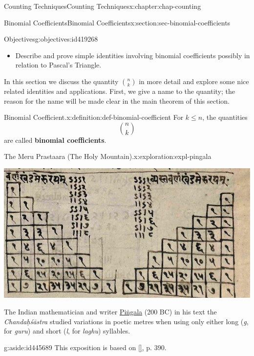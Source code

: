 \documentclass[oneside,10pt,]{book}
\newcommand{\xreffont}{\relax}
\newcommand{\terminology}[1]{\textbf{#1}}
\newcommand{\pubtitle}[1]{\textsl{#1}}
\numberwithin{equation}{section}
\begin{document}
\begin{chapterptx}{Counting Techniques}{}{Counting Techniques}{}{}{x:chapter:chap-counting}
\begin{sectionptx}{Binomial Coefficients}{}{Binomial Coefficients}{}{}{x:section:sec-binomial-coefficients}
\begin{objectives}{Objectives}{g:objectives:id419268}
\begin{itemize}[label=\textbullet]
\item{}Describe and prove simple identities involving binomial coefficients possibly in relation to Pascal's Triangle.%
\end{itemize}
\end{objectives}
In this section we discuss the quantity \(\displaystyle\binom{n}{k}\) in more detail and explore some nice related identities and applications. First, we give a name to the quantity; the reason for the name will be made clear in the main theorem of this section.%
\begin{definition}{Binomial Coefficient.}{x:definition:def-binomial-coefficient}%
For \(k \leq n\), the quantities%
\begin{equation*}
\binom{n}{k}
\end{equation*}
are called \terminology{binomial coefficients}.%
\end{definition}
\begin{exploration}{The Meru Prastaara (The Holy Mountain).}{x:exploration:expl-pingala}%
\begin{sidebyside}{1}{0.175}{0.175}{0}%
\begin{sbspanel}{0.65}%
\includegraphics[width=\linewidth]{figs/meru-prastaara.png}
\end{sbspanel}%
\end{sidebyside}%
\par
The Indian mathematician and writer \href{https://en.wikipedia.org/wiki/Pingala}{Piṅgala} (200 BC) in his text the \pubtitle{Chandaḥśāstra} studied variations in poetic metres when using only either long (\emph{g}, for \emph{guru}) and short (\emph{l}, for \emph{laghu}) syllables.%
\begin{aside}{}{g:aside:id445689}%
This exposition is based on \hyperlink{x:biblio:bib-kolachana-2019}{[{\xreffont 5}]}, p. 390.%
\end{aside}

\end{exploration}
\end{sectionptx}
\end{chapterptx}
\end{document}
